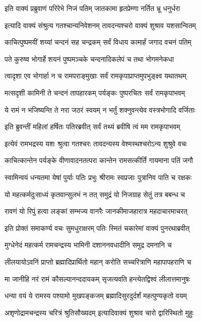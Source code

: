 \twolineshloka
{इति वाक्यं प्रब्रुवाणं परिरेभे निजं पतिम्}
{जातकामा हृतप्रेम्णा नर्तित भ्रू धनुर्धरा}%

\twolineshloka
{इत्यादि वाक्यं संश्रुत्य गतश्चान्यनिवेशनम्}
{तावदन्यश्चरो वाक्यं शुश्राव यशसान्वितम्}%

\twolineshloka
{काचित्पुष्पमयीं शय्यां चन्दनं सह चन्द्रकम्}
{सर्वं विधाय कामार्हं जगाद वचनं पतिम्}%

\twolineshloka
{पते कुरुष्व भोगार्हे शयनं पुष्पमञ्चके}
{चन्दनादिकलेपं च तथा भोगमनेकधा}%

\twolineshloka
{त्वादृशा एव भोगार्हा न च रामपराङ्मुखाः}
{सर्वं रामकृपाप्राप्तमुपभुङ्क्ष्व यथातथम्}%

\twolineshloka
{मत्सदृशी कामिनी ते चन्दनं तापहारकम्}
{पर्यङ्कः पुष्परचितः सर्वं रामकृपाभवम्}%

\twolineshloka
{ये रामं न भजिष्यन्ति ते नरा जठरं स्वयम्}
{न भर्तुं शक्नुवन्त्येव वस्त्रभोगादि वर्जिताः}%

\twolineshloka
{इति ब्रुवन्तीं महिलां हर्षितः पतिरब्रवीत्}
{सर्वं तथ्यं ब्रवीषि त्वं मम रामकृपाभवम्}%

\twolineshloka
{इत्येवं रामभद्रस्य यशः श्रुत्वा गतश्चरः}
{तावदन्यस्य वेश्मस्थश्चरोऽन्य शुश्रुवे वचः}%

\twolineshloka
{काचित्कान्तेन पर्यङ्के वीणावादनतत्परा}
{कान्तेन रामसत्कीर्तिं गायमाना पतिं जगौ}%

\twolineshloka
{स्वामिन्वयं धन्यतमा येषां पुर्याः पतिः प्रभुः}
{श्रीरामः स्वप्रजाः पुत्रानिव पाति च रक्षकः}%

\twolineshloka
{यो महत्कर्मदुःसाध्यं कृतवान्सुलभं न तत्}
{समुद्रं यो निजग्राह सेतुं तत्र बबन्ध च}%

\twolineshloka
{रावणं यो रिपुं हत्वा लङ्कां सम्भज्य वानरैः}
{जानकीमाजहारात्र महदाचारमाचरत्}%

\twolineshloka
{इति प्रोक्तं समाकर्ण्य वचः सुमधुराक्षरम्}
{पतिः स्मितं चकारेमां वाक्यं पुनरथाब्रवीत्}%

\twolineshloka
{मुग्धेनेदं महत्कर्म रामचन्द्रस्य भामिनी}
{दशाननवधादीनि समुद्र दमनानि च}%

\twolineshloka
{लीलयायोऽवनिं प्राप्तो ब्रह्मादिप्रार्थितो महान्}
{करोति सच्चरित्राणि महापापहराणि च}%

\twolineshloka
{मा जानीहि नरं रामं कौसल्यानन्ददायकम्}
{सृजत्यवति हन्त्येतद्विश्वं लीलात्तमानुषः}%

\twolineshloka
{धन्या वयं ये रामस्य पश्यामो मुखपङ्कजम्}
{ब्रह्मादिसुरदुर्दर्शं महत्पुण्यकृतो वयम्}%

\twolineshloka
{अशृणोद्रामचन्द्रस्य चरित्रं श्रुतिसौख्यदम्}
{इत्यादिवाक्यं शुश्राव चारो द्वारिस्थितो मुहुः}%

